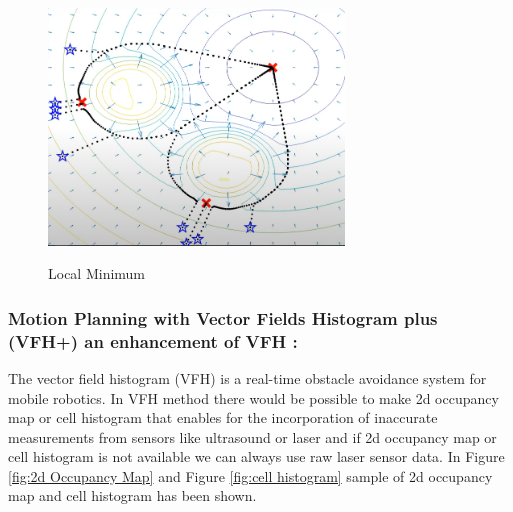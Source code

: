 \begin{figure}[H]
  \centering
  \includegraphics[width= 0.7\textwidth]{Figures/pot.PNG}
  \caption[Local Minimum]{Local Minimum} \cite{LocalMinimum}
   \label{fig:Local Minimum}
\end{figure}





\subsubsection{Motion Planning with Vector Fields Histogram plus (VFH+) an enhancement of VFH : }


  The vector field histogram (VFH) is a real-time obstacle avoidance system for mobile robotics. In VFH method there would be possible to make 2d occupancy map or cell histogram that enables for the incorporation of inaccurate measurements from sensors like ultrasound or laser and if 2d occupancy map or cell histogram is not available we can always use raw laser sensor data. In Figure \ref{fig:2d Occupancy Map} and Figure \ref{fig:cell histogram} sample of 2d occupancy map and cell histogram has been shown.
 

